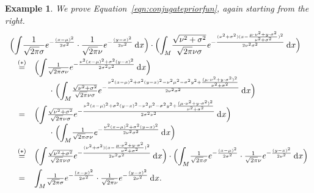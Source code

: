 \documentclass{mscs}
\newcommand{\intd}{{\kern.2em}\mathrm{d}{\kern.03em}}
\newtheorem{example}[theorem]{Example}
\begin{document}
\begin{example}
\noindent We prove Equation~\eqref{eqn:conjugatepriorfun}, again
starting from the right.
\[ \begin{array}{rcl}
\lefteqn{\Big({\displaystyle \int}
  \frac{1}{\sqrt{2\pi}\sigma}e^{-\frac{(x-\mu)^{2}}{2\sigma^{2}}} \cdot
  \frac{1}{\sqrt{2\pi}\nu}e^{-\frac{(y-x)^{2}}{2\nu^{2}}}\intd x\Big) \cdot
  \Big({\displaystyle \int_{M}} 
  \frac{\sqrt{\nu^{2}+\sigma^{2}}}{\sqrt{2\pi}\nu\sigma}
   e^{-\frac{(\nu^{2}+\sigma^{2}) (x-\frac{\mu\cdot\nu^{2} + y\cdot\sigma^{2}}
    {\nu^{2}+\sigma^{2}})^{2}}{2\nu^{2}\sigma^{2}}}\intd x\Big)}
\\[+1em]
& \smash{\stackrel{(*)}{=}} &
\Big({\displaystyle \int}\frac{1}{\sqrt{2\pi}\sigma\nu}
  e^{-\frac{\nu^{2}(x-\mu)^{2} + \sigma^{2}(y-x)^{2}}{2\sigma^{2}\nu^{2}}}\intd x\Big) 
\\
& & \qquad \cdot\; \Big({\displaystyle \int_{M}} 
  \frac{\sqrt{\nu^{2}+\sigma^{2}}}{\sqrt{2\pi}\nu\sigma}
   e^{-\frac{\nu^{2}(x-\mu)^{2} + \sigma^{2}(y-x)^{2} - \nu^{2}\mu^{2} - 
      \sigma^{2}y^{2} + \frac{(\mu\cdot\nu^{2} + y\cdot\sigma^{2})^{2}}
    {\nu^{2}+\sigma^{2}}}{2\nu^{2}\sigma^{2}}}\intd x\Big)
\\
& = &
\Big({\displaystyle \int}\frac{\sqrt{\nu^{2}+\sigma^{2}}}{\sqrt{2\pi}\nu\sigma}
  e^{-\frac{\nu^{2}(x-\mu)^{2} + \sigma^{2}(y-x)^{2} - \nu^{2}\mu^{2} - 
      \sigma^{2}y^{2} + \frac{(\mu\cdot\nu^{2} + y\cdot\sigma^{2})^{2}}
    {\nu^{2}+\sigma^{2}}}{2\sigma^{2}\nu^{2}}}\intd x\Big) 
\\
& & \qquad \cdot\; \Big({\displaystyle \int_{M}} 
  \frac{1}{\sqrt{2\pi}\sigma\nu}
   e^{-\frac{\nu^{2}(x-\mu)^{2} + \sigma^{2}(y-x)^{2}}{2\nu^{2}\sigma^{2}}}\intd x\Big)
\\
& \smash{\stackrel{(*)}{=}} &
\Big({\displaystyle \int} 
  \frac{\sqrt{\nu^{2}+\sigma^{2}}}{\sqrt{2\pi}\nu\sigma}
   e^{-\frac{(\nu^{2}+\sigma^{2}) (x-\frac{\mu\cdot\nu^{2} + y\cdot\sigma^{2}}
    {\nu^{2}+\sigma^{2}})^{2}}{2\nu^{2}\sigma^{2}}}\intd x\Big) \cdot
   \Big({\displaystyle \int_{M}}
   \frac{1}{\sqrt{2\pi}\sigma}e^{-\frac{(x-\mu)^{2}}{2\sigma^{2}}} \cdot
   \frac{1}{\sqrt{2\pi}\nu}e^{-\frac{(y-x)^{2}}{2\nu^{2}}}\intd x\Big)
\\[+1em]
& = &
{\displaystyle \int_{M}}
  \frac{1}{\sqrt{2\pi}\sigma}e^{-\frac{(x-\mu)^{2}}{2\sigma^{2}}} \cdot
  \frac{1}{\sqrt{2\pi}\nu}e^{-\frac{(y-x)^{2}}{2\nu^{2}}}\intd x.
\end{array} \]


\end{example}
\end{document}
